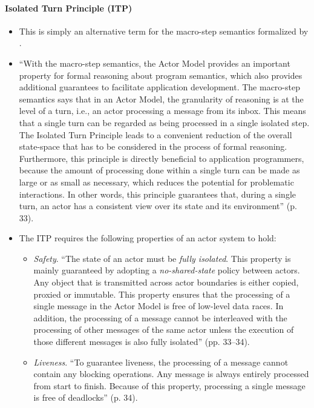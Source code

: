 \paragraph{Isolated Turn Principle (ITP)}
\begin{itemize}
\item This is simply an alternative term for the macro-step semantics formalized by \cite{Agha1997}.
\item ``With the macro-step semantics, the Actor Model provides an important property for formal reasoning about program semantics, which also provides additional guarantees to facilitate application development. The macro-step semantics says that in an Actor Model, the granularity of reasoning is at the level of a turn, i.e., an actor processing a message from its inbox. This means that a single turn can be regarded as being processed in a single isolated step. The Isolated Turn Principle leads to a convenient reduction of the overall state-space that has to be considered in the process of formal reasoning. Furthermore, this principle is directly beneficial to application programmers, because the amount of processing done within a single turn can be made as large or as small as necessary, which reduces the potential for problematic interactions. In other words, this principle guarantees that, during a single turn, an actor has a consistent view over its state and its environment'' (p. 33).
\item The ITP requires the following properties of an actor system to hold:
	\begin{itemize}
	\item \emph{Safety}. ``The state of an actor must be \emph{fully isolated}. This property is mainly guaranteed by adopting a \emph{no-shared-state} policy between actors. Any object that is transmitted across actor boundaries is either copied, proxied or immutable. This property ensures that the processing of a single message in the Actor Model is free of low-level data races. In addition, the processing of a message cannot be interleaved with the processing of other messages of the same actor unless the execution of those different messages is also fully isolated'' (pp. 33--34).
	\item \emph{Liveness}. ``To guarantee liveness, the processing of a message cannot contain any blocking operations. Any message is always entirely processed from start to finish. Because of this property, processing a single message is free of deadlocks'' (p. 34).
	\end{itemize}
\end{itemize}

